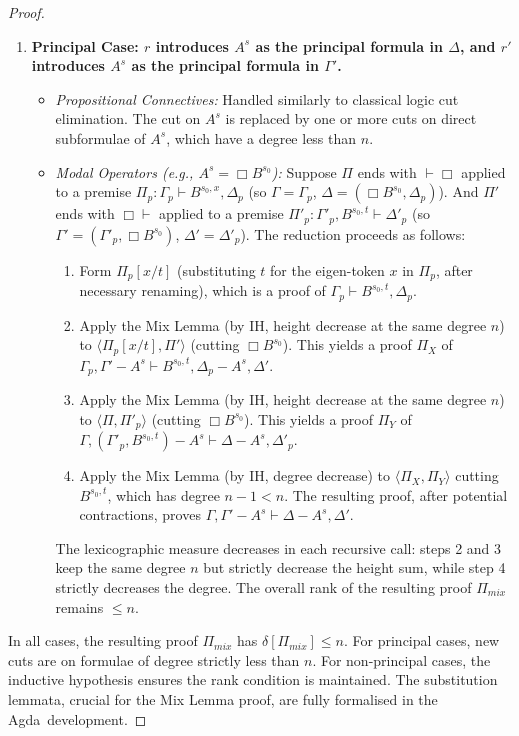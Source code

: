 \documentclass{article}
\newcommand{\seq}[2]{{#1} \vdash{} {#2}}
\newcommand{\pf}[2]{{#1}^{#2}} %
\newcommand{\cana}[1]{#1\!-\!\pf{A}{s}}
\newcommand{\agda}{\textsf{Agda}}
\theoremstyle{definition}
\begin{document}
\begin{proof}
\begin{enumerate}
    \item \textbf{Principal Case: $r$ introduces $\pf{A}{s}$ as the principal formula in $\Delta$, and $r'$ introduces $\pf{A}{s}$ as the principal formula in $\Gamma'$.}
        \begin{itemize}
            \item \textit{Propositional Connectives:} Handled similarly to classical logic cut elimination. The cut on $\pf{A}{s}$ is replaced by one or more cuts on direct subformulae of $\pf{A}{s}$, which have a degree less than $n$.
            \item \textit{Modal Operators (e.g., $\pf{A}{s} = \pf{\Box B}{s_0}$):}
                Suppose $\Pi$ ends with $\vdash \Box$ applied to a premise $\Pi_p: \seq{\Gamma_p}{\pf{B}{s_0,x}, \Delta_p}$ (so $\Gamma = \Gamma_p$, $\Delta = (\pf{\Box B}{s_0}, \Delta_p)$).
                And $\Pi'$ ends with $\Box \vdash$ applied to a premise $\Pi'_p: \seq{\Gamma'_p, \pf{B}{s_0,t}}{\Delta'_p}$ (so $\Gamma' = (\Gamma'_p, \pf{\Box B}{s_0})$, $\Delta' = \Delta'_p$).
                The reduction proceeds as follows:
                \begin{enumerate}
                    \item Form $\Pi_p[x/t]$ (substituting $t$ for the eigen-token $x$ in $\Pi_p$, after necessary renaming), which is a proof of $\seq{\Gamma_p}{\pf{B}{s_0,t}, \Delta_p}$.
                    \item Apply the Mix Lemma (by IH, height decrease at the same degree $n$) to $\langle \Pi_p[x/t], \Pi' \rangle$ (cutting $\pf{\Box B}{s_0}$). This yields a proof $\Pi_X$ of $\seq{\Gamma_p, \cana{\Gamma'}}{\pf{B}{s_0,t}, \cana{\Delta_p}, \Delta'}$.
                    \item Apply the Mix Lemma (by IH, height decrease at the same degree $n$) to $\langle \Pi, \Pi'_p \rangle$ (cutting $\pf{\Box B}{s_0}$). This yields a proof $\Pi_Y$ of $\seq{\Gamma, \cana{(\Gamma'_p, \pf{B}{s_0,t})}}{\cana{\Delta}, \Delta'_p}$.
                    \item Apply the Mix Lemma (by IH, degree decrease) to $\langle \Pi_X, \Pi_Y \rangle$ cutting $\pf{B}{s_0,t}$, which has degree $n-1 < n$. The resulting proof, after potential contractions, proves $\seq{\Gamma, \cana{\Gamma'}}{\cana{\Delta}, \Delta'}$.
                \end{enumerate}
                The lexicographic measure decreases in each recursive call: steps 2 and 3 keep the same degree $n$ but strictly decrease the height sum, while step 4 strictly decreases the degree. The overall rank of the resulting proof $\Pi_{mix}$ remains $\le n$.
        \end{itemize}
\end{enumerate}
In all cases, the resulting proof $\Pi_{mix}$ has $\delta[\Pi_{mix}] \le n$. For principal cases, new cuts are on formulae of degree strictly less than $n$. For non-principal cases, the inductive hypothesis ensures the rank condition is maintained.
The substitution lemmata, crucial for the Mix Lemma proof, are fully formalised in the \agda\ development.
\end{proof}
\end{document}
